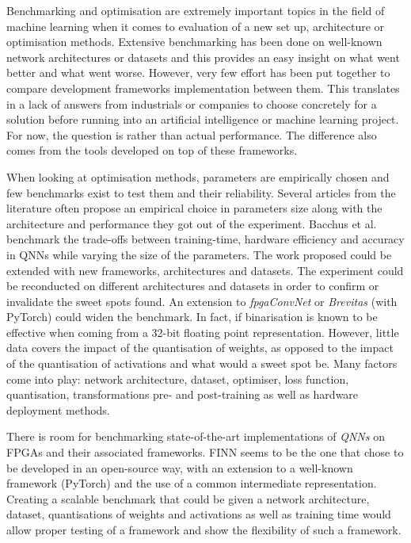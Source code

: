 Benchmarking and optimisation are extremely important topics in the field of machine learning when it comes to evaluation of a new set up, architecture or optimisation methods. Extensive benchmarking has been done on well-known network architectures or datasets and this provides an easy insight on what went better and what went worse. However, very few effort has been put together to compare development frameworks implementation between them. This translates in a lack of answers from industrials or companies to choose concretely for a solution before running into an artificial intelligence or machine learning project. For now, the question is  rather than actual performance. The difference also comes from the tools developed on top of these frameworks.

When looking at optimisation methods, parameters are empirically chosen and few benchmarks exist to test them and their reliability. Several articles from the literature often propose an empirical choice in parameters size along with the architecture and performance they got out of the experiment. Bacchus et al. \cite{Bacchus2020} benchmark the trade-offs between training-time, hardware efficiency and accuracy in QNNs while varying the size of the parameters. The work proposed could be extended with new frameworks, architectures and  datasets. The experiment could be reconducted on different architectures and datasets in order to confirm or invalidate the sweet spots found. An extension to \emph{fpgaConvNet} or \emph{Brevitas} (with PyTorch) could widen the benchmark. In fact, if binarisation is known to be effective when coming from a 32-bit floating point representation. However, little data covers the impact of the quantisation of weights, as opposed to the impact of the quantisation of activations and what would a sweet spot be. Many factors come into play: network architecture, dataset, optimiser, loss function, quantisation, transformations pre- and post-training as well as hardware deployment methods.

There is room for benchmarking state-of-the-art implementations of \emph{QNNs} on FPGAs and their associated frameworks. FINN seems to be the one that chose to be developed in an open-source way, with an extension to a well-known framework (PyTorch) and the use of a common intermediate representation. Creating a scalable benchmark that could be given a network architecture, dataset, quantisations of weights and activations as well as training time would allow proper testing of a framework and show the flexibility of such a framework.
